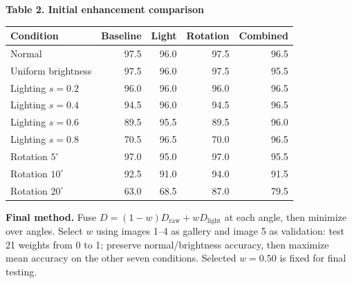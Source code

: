 \documentclass[10pt,a4paper]{article}
\begin{document}
\begin{minipage}{\linewidth}
\centering
\textbf{Table 2. Initial enhancement comparison}\par\vspace{2pt}
{\fontsize{9}{10.5}\selectfont
\begin{tabular}{@{}lrrrr@{}}
\toprule
Condition & Baseline & Light & Rotation & Combined\\
\midrule
Normal & 97.5 & 96.0 & 97.5 & 96.5\\
Uniform brightness & 97.5 & 96.0 & 97.5 & 95.5\\
Lighting $s=0.2$ & 96.0 & 96.0 & 96.0 & 96.5\\
Lighting $s=0.4$ & 94.5 & 96.0 & 94.5 & 96.5\\
Lighting $s=0.6$ & 89.5 & 95.5 & 89.5 & 96.0\\
Lighting $s=0.8$ & 70.5 & 96.5 & 70.0 & 96.5\\
Rotation $5^\circ$ & 97.0 & 95.0 & 97.0 & 95.5\\
Rotation $10^\circ$ & 92.5 & 91.0 & 94.0 & 91.5\\
Rotation $20^\circ$ & 63.0 & 68.5 & 87.0 & 79.5\\
\bottomrule
\end{tabular}}
\end{minipage}
\par\vspace{3pt}
\textbf{Final method.} Fuse $D=(1-w)D_{\mathrm{raw}}+wD_{\mathrm{light}}$ at each angle, then minimize over angles. Select $w$ using images 1--4 as gallery and image 5 as validation: test 21 weights from 0 to 1; preserve normal/brightness accuracy, then maximize mean accuracy on the other seven conditions. Selected $w=0.50$ is fixed for final testing.
\end{document}
